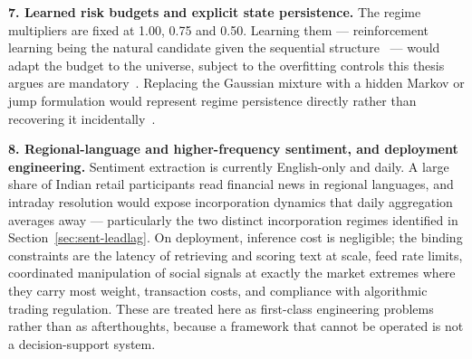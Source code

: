 \textbf{7. Learned risk budgets and explicit state persistence.} The regime multipliers are fixed
at 1.00, 0.75 and 0.50. Learning them --- reinforcement learning being the natural candidate given
the sequential structure~\cite{kabbani2022drl} --- would adapt the budget to the universe, subject
to the overfitting controls this thesis argues are mandatory~\cite{harvey2015}. Replacing the
Gaussian mixture with a hidden Markov or jump formulation would represent regime persistence
directly rather than recovering it incidentally~\cite{luo2026regime,hamilton1989}.

\textbf{8. Regional-language and higher-frequency sentiment, and deployment engineering.} Sentiment
extraction is currently English-only and daily. A large share of Indian retail participants read
financial news in regional languages, and intraday resolution would expose incorporation dynamics
that daily aggregation averages away --- particularly the two distinct incorporation regimes
identified in Section~\ref{sec:sent-leadlag}. On deployment, inference cost is negligible; the
binding constraints are the latency of retrieving and scoring text at scale, feed rate limits,
coordinated manipulation of social signals at exactly the market extremes where they carry most
weight, transaction costs, and compliance with algorithmic trading regulation. These are treated
here as first-class engineering problems rather than as afterthoughts, because a framework that
cannot be operated is not a decision-support system.

